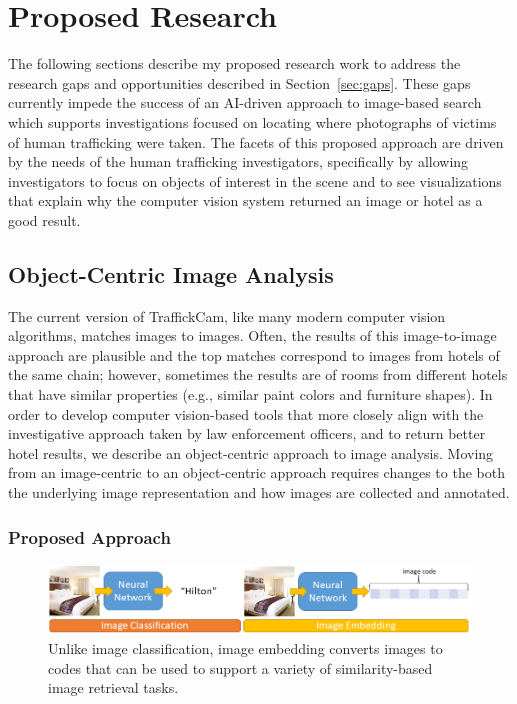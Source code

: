 \documentclass[12pt]{article}
\begin{document}
\section{Proposed Research}

The following sections describe my proposed research work to address the research gaps and opportunities described in Section~\ref{sec:gaps}. These gaps currently impede the success of an AI-driven approach to image-based search which supports investigations focused on locating where photographs of victims of human trafficking were taken. The facets of this proposed approach are driven by the needs of the human trafficking investigators, specifically by allowing investigators to focus on objects of interest in the scene and to see visualizations that explain why the computer vision system returned an image or hotel as a good result.




\subsection{Object-Centric Image Analysis}
\label{sec:usability}

The current version of TraffickCam, like many modern computer vision algorithms, matches images to images. Often, the results of this image-to-image approach are plausible and the top matches correspond to images from hotels of the same chain; however, sometimes the results are of rooms from different hotels that have similar properties (e.g., similar paint colors and furniture shapes). In order to develop computer vision-based tools that more closely align with the investigative approach taken by law enforcement officers, and to return better hotel results, we describe an object-centric approach to image analysis. Moving from an image-centric to an object-centric approach requires changes to the both the underlying image representation and how images are collected and annotated.

\subsubsection{Proposed Approach}
\begin{figure}
    \centering
    \includegraphics[width=.9\textwidth]{figs/classVsEmbed.png}
    \caption[Image embedding codes]{Unlike image classification, image embedding converts images to codes that can be used to support a variety of similarity-based image retrieval tasks.}
    \label{fig:embedding}
\end{figure}
\end{document}
